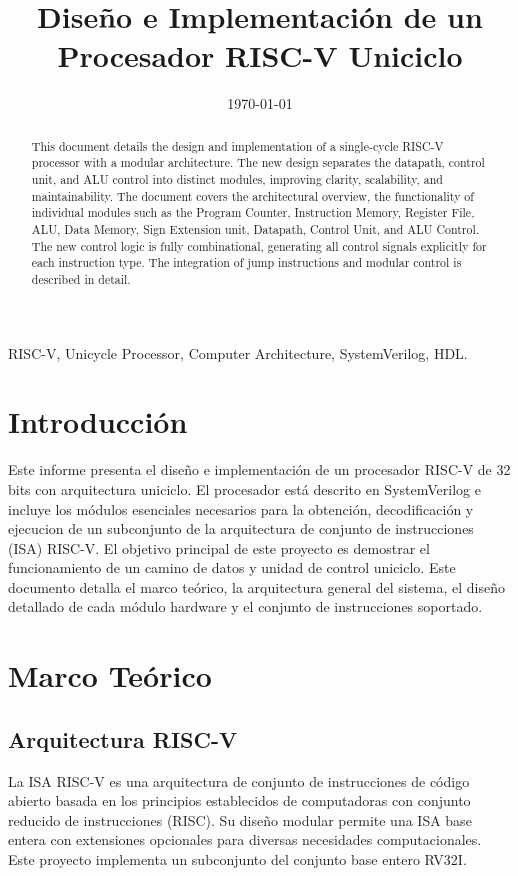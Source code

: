 \documentclass[conference]{IEEEtran}
\title{Diseño e Implementación de un Procesador RISC-V Uniciclo}
\date{\today}
\begin{document}
\maketitle
\begin{abstract}
This document details the design and implementation of a single-cycle RISC-V processor with a modular architecture. The new design separates the datapath, control unit, and ALU control into distinct modules, improving clarity, scalability, and maintainability. The document covers the architectural overview, the functionality of individual modules such as the Program Counter, Instruction Memory, Register File, ALU, Data Memory, Sign Extension unit, Datapath, Control Unit, and ALU Control. The new control logic is fully combinational, generating all control signals explicitly for each instruction type. The integration of jump instructions and modular control is described in detail.
\end{abstract}

\begin{IEEEkeywords}
RISC-V, Unicycle Processor, Computer Architecture, SystemVerilog, HDL.
\end{IEEEkeywords}

\section{Introducción}
\label{sec:introduction}
Este informe presenta el diseño e implementación de un procesador RISC-V de 32 bits con arquitectura uniciclo. El procesador está descrito en SystemVerilog e incluye los módulos esenciales necesarios para la obtención, decodificación y ejecucion de un subconjunto de la arquitectura de conjunto de instrucciones (ISA) RISC-V.
El objetivo principal de este proyecto es demostrar el funcionamiento de un camino de datos y unidad de control uniciclo. Este documento detalla el marco teórico, la arquitectura general del sistema, el diseño detallado de cada módulo hardware y el conjunto de instrucciones soportado.

\section{Marco Teórico}
\label{sec:theoretical_framework}
\subsection{Arquitectura RISC-V}
La ISA RISC-V es una arquitectura de conjunto de instrucciones de código abierto basada en los principios establecidos de computadoras con conjunto reducido de instrucciones (RISC). Su diseño modular permite una ISA base entera con extensiones opcionales para diversas necesidades computacionales. Este proyecto implementa un subconjunto del conjunto base entero RV32I.
\end{document}
